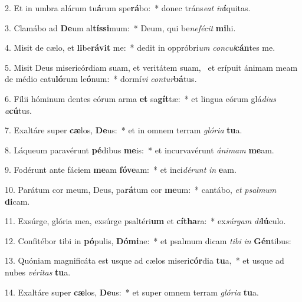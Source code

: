 2. Et in umbra alárum tu\textbf{á}rum spe\textbf{rá}bo:~*  donec tráns\textit{e}\textit{at} \textit{in}\textbf{í}quitas.\

3. Clamábo ad \textbf{De}um al\textbf{tís}\textbf{si}mum:~*  Deum, qui be\textit{ne}\textit{fé}\textit{cit} \textbf{mi}hi.\

4. Misit de cælo, et \textbf{li}be\textbf{rá}\textbf{vit} me:~*  dedit in oppróbri\textit{um} \textit{con}\textit{cul}\textbf{cán}tes me.\

5. Misit Deus misericórdiam suam, et veritátem suam, \dag\  et erípuit ánimam meam de médio catu\textbf{ló}rum le\textbf{ó}num:~*  dormí\textit{vi} \textit{con}\textit{tur}\textbf{bá}tus.\

6. Fílii hóminum dentes eórum arma \textbf{et} sa\textbf{gít}tæ:~*  et lingua eórum glá\textit{di}\textit{us} \textit{a}\textbf{cú}tus.\

7. Exaltáre super \textbf{cæ}los, \textbf{De}us:~*  et in omnem terram \textit{gló}\textit{ri}\textit{a} \textbf{tu}a.\

8. Láqueum paravérunt \textbf{pé}dibus \textbf{me}is:~*  et incurvavérunt \textit{á}\textit{ni}\textit{mam} \textbf{me}am.\

9. Fodérunt ante fáciem \textbf{me}am \textbf{fó}\textbf{ve}am:~*  et inci\textit{dé}\textit{runt} \textit{in} \textbf{e}am.\

10. Parátum cor meum, Deus, pa\textbf{rá}tum cor \textbf{me}um:~*  cantábo, \textit{et} \textit{psal}\textit{mum} \textbf{di}cam.\

11. Exsúrge, glória mea, exsúrge psaltéri\textbf{um} et \textbf{cí}\textbf{tha}ra:~*  ex\textit{súr}\textit{gam} \textit{di}\textbf{lú}culo.\

12. Confitébor tibi in \textbf{pó}pulis, \textbf{Dó}\textbf{mi}ne:~*  et psalmum dicam \textit{ti}\textit{bi} \textit{in} \textbf{Gén}tibus:\

13. Quóniam magnificáta est usque ad cælos miseri\textbf{cór}dia \textbf{tu}a,~*  et usque ad nubes \textit{vé}\textit{ri}\textit{tas} \textbf{tu}a.\

14. Exaltáre super \textbf{cæ}los, \textbf{De}us:~*  et super omnem terram \textit{gló}\textit{ri}\textit{a} \textbf{tu}a.\

